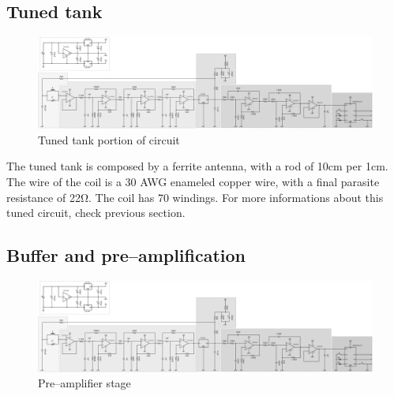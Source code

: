 \subsection{Tuned tank}
\begin{figure}[h]
	\centering
	\includegraphics*[viewport=3 3 240 457,scale=0.4]{ch2/img/receiver3.pdf}
	\caption{Tuned tank portion of circuit}
	\label{fig:tunedtank}
\end{figure}

The tuned tank is composed by a ferrite antenna, with a rod of \num{10}\si{\centi\meter} per \diameter \num{1}\si{\centi\meter}. The wire of the coil is a \num{30} AWG enameled copper wire, with a final parasite resistance of \num{22}\si{\ohm}. The coil has \num{70} windings. For more informations about this tuned circuit, check previous section.

\subsection{Buffer and pre--amplification}
\begin{figure}[h]
	\centering
	\includegraphics*[viewport=170 3 1250 380,scale=0.4]{ch2/img/receiver3.pdf}
	\caption{Pre--amplifier stage}
	\label{fig:filter1}
\end{figure}

